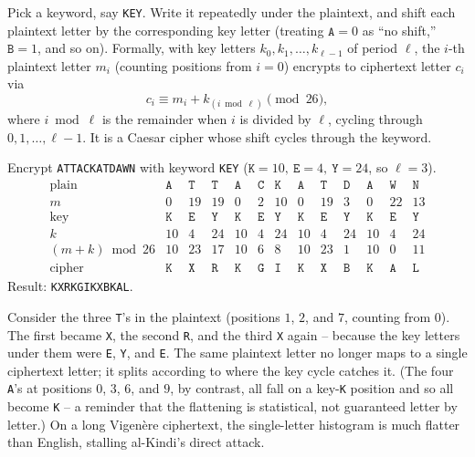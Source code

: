 Pick a keyword, say \texttt{KEY}. Write it repeatedly under the plaintext, and shift each
plaintext letter by the corresponding key letter (treating $\texttt{A}=0$ as ``no shift,''
$\texttt{B}=1$, and so on). Formally, with key letters $k_0, k_1, \ldots, k_{\ell-1}$ of period
$\ell$, the $i$-th plaintext letter $m_i$ (counting positions from $i = 0$) encrypts to
ciphertext letter $c_i$ via
\[
  c_i \equiv m_i + k_{(i \bmod \ell)} \pmod{26},
\]
where $i \bmod \ell$ is the remainder when $i$ is divided by $\ell$, cycling through
$0, 1, \ldots, \ell - 1$. It is a Caesar cipher whose shift cycles through the keyword.

\begin{example}
\label{ch02:vig-encrypt}
Encrypt \texttt{ATTACKATDAWN} with keyword \texttt{KEY} ($\texttt{K}=10,\ \texttt{E}=4,\
\texttt{Y}=24$, so $\ell = 3$).
\[
\begin{array}{c|cccccccccccc}
\text{plain} & \texttt{A}&\texttt{T}&\texttt{T}&\texttt{A}&\texttt{C}&\texttt{K}&\texttt{A}&\texttt{T}&\texttt{D}&\texttt{A}&\texttt{W}&\texttt{N}\\
m            & 0&19&19&0&2&10&0&19&3&0&22&13\\
\text{key}   & \texttt{K}&\texttt{E}&\texttt{Y}&\texttt{K}&\texttt{E}&\texttt{Y}&\texttt{K}&\texttt{E}&\texttt{Y}&\texttt{K}&\texttt{E}&\texttt{Y}\\
k            & 10&4&24&10&4&24&10&4&24&10&4&24\\
(m+k) \bmod 26 & 10&23&17&10&6&8&10&23&1&10&0&11\\
\text{cipher}& \texttt{K}&\texttt{X}&\texttt{R}&\texttt{K}&\texttt{G}&\texttt{I}&\texttt{K}&\texttt{X}&\texttt{B}&\texttt{K}&\texttt{A}&\texttt{L}
\end{array}
\]
Result: \texttt{KXRKGIKXBKAL}.
\end{example}

Consider the three \texttt{T}'s in the plaintext (positions $1$, $2$, and $7$, counting from
$0$). The first became \texttt{X}, the second \texttt{R}, and the third \texttt{X} again --
because the key letters under them were \texttt{E}, \texttt{Y}, and \texttt{E}. The same
plaintext letter no longer maps to a single ciphertext letter; it splits according to where the
key cycle catches it. (The four \texttt{A}'s at positions $0$, $3$, $6$, and $9$, by contrast,
all fall on a key-\texttt{K} position and so all become \texttt{K} -- a reminder that the
flattening is statistical, not guaranteed letter by letter.) On a long Vigen\`ere ciphertext,
the single-letter histogram is much flatter than English, stalling al-Kindi's direct attack.


